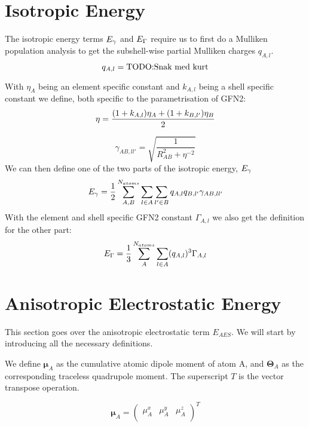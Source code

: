 \section{Isotropic Energy}
The isotropic energy terms $\E{\gamma}$ and $\E{\Gamma}$ require us to first do a Mulliken population analysis to get the subshell-wise partial Mulliken charges $q_{A,l}$.
\begin{equation}
    q_{A,l} = \text{TODO:Snak med kurt}\\
\end{equation}

With $\eta_A$ being an element specific constant and $k_{A,l}$ being a shell specific constant we define, both specific to the parametrisation of GFN2:
\begin{equation}
    \eta = \frac{(1+k_{A,l})\eta_A+(1+k_{B,l'})\eta_B}{2}\\
\end{equation}

\begin{equation}
    \gamma_{AB,ll'} = \sqrt{\frac{1}{R_{AB}^2+\eta^{-2}}}
\end{equation}
We can then define one of the two parts of the isotropic energy, $\E{\gamma}$
\begin{equation}
    \E{\gamma} = \frac{1}{2}\sum_{A,B}^{N_{atoms}}\sum_{l\in A}\sum_{l'\in B}q_{A,l}q_{B,l'}\gamma_{AB,ll'}\label{eq:gamma}
\end{equation}
With the element and shell specific GFN2 constant $\Gamma_{A,l}$ we also get the definition for the other part:
\begin{equation}
    \E{\Gamma} = \frac{1}{3}\sum_A^{N_{atoms}}\sum_{l\in A}(q_{A,l})^3\Gamma_{A,l} \label{eq:Gamma}
\end{equation}



\section{Anisotropic Electrostatic Energy}

This section goes over the anisotropic electrostatic term $E_{AES}$. We will start by introducing all the necessary definitions.

We define $\pmb{\mu}_A$ as the cumulative atomic dipole moment of atom A, and $\pmb{\Theta}_A$ as the corresponding traceless quadrupole moment. The superscript $T$ is the vector transpose operation.

\begin{equation}
    \pmb{\mu}_A = 
    \begin{pmatrix}
        \mu_A^{x}&
        \mu_A^{y}&
        \mu_A^{z}\\
    \end{pmatrix}^T
\end{equation}

